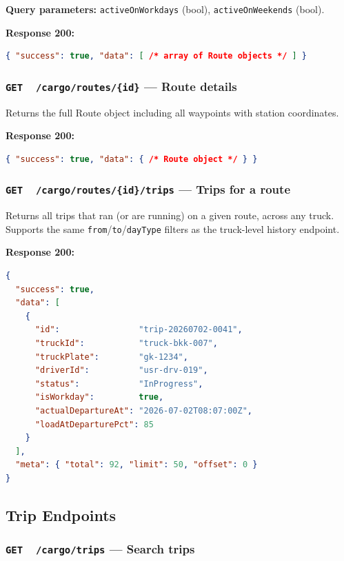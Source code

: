 \documentclass{article}
\newcommand{\GET}{\colorbox{evblue!20}{\texttt{\textbf{\color{evblue}GET}}}}
\begin{document}
\textbf{Query parameters:} \texttt{activeOnWorkdays} (bool), \texttt{activeOnWeekends} (bool).

\textbf{Response 200:}
\begin{lstlisting}[language=json]
{ "success": true, "data": [ /* array of Route objects */ ] }
\end{lstlisting}

\subsubsection{\GET\ \ \texttt{/cargo/routes/\{id\}} --- Route details}

Returns the full Route object including all waypoints with station coordinates.

\textbf{Response 200:}
\begin{lstlisting}[language=json]
{ "success": true, "data": { /* Route object */ } }
\end{lstlisting}

\subsubsection{\GET\ \ \texttt{/cargo/routes/\{id\}/trips} --- Trips for a route}

Returns all trips that ran (or are running) on a given route, across any truck.
Supports the same \texttt{from}/\texttt{to}/\texttt{dayType} filters as the
truck-level history endpoint.

\textbf{Response 200:}
\begin{lstlisting}[language=json, caption=Route trip history response]
{
  "success": true,
  "data": [
    {
      "id":                "trip-20260702-0041",
      "truckId":           "truck-bkk-007",
      "truckPlate":        "gk-1234",
      "driverId":          "usr-drv-019",
      "status":            "InProgress",
      "isWorkday":         true,
      "actualDepartureAt": "2026-07-02T08:07:00Z",
      "loadAtDeparturePct": 85
    }
  ],
  "meta": { "total": 92, "limit": 50, "offset": 0 }
}
\end{lstlisting}

\subsection{Trip Endpoints}

\subsubsection{\GET\ \ \texttt{/cargo/trips} --- Search trips}
\end{document}
